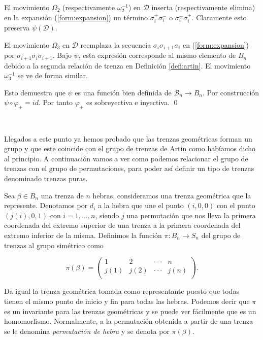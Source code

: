 \documentclass[12pt]{article}
\theoremstyle{definition}
\begin{document}
El movimiento $\Omega_2$ (respectivamente $\omega_2^{-1}$) en $\mathcal{D}$ inserta (respectivamente elimina) en la expansión (\ref{form:expansion}) un término $\sigma_i^+\sigma_i^-$ o $\sigma_i^-\sigma_i^+$. Claramente esto preserva $\psi(\mathcal{D})$.

El movimiento $\Omega_3$ en $\mathcal{D}$ reemplaza la secuencia $\sigma_{i}\sigma_{i+1}\sigma_{i}$ en (\ref{form:expansion}) por $\sigma_{i+1}\sigma_{i}\sigma_{i+1}$. Bajo $\psi$, esta expresión corresponde al mismo elemento de $B_n$ debido a la segunda relación de trenza en Definición \ref{defi:artin}. El movimiento $\omega_3^{-1}$ se ve de forma similar.

Esto demuestra que $\psi$ es una función bien definida de $\mathcal{B}_n\rightarrow B_n$. Por construcción $\psi\circ\varphi_+=id$. Por tanto $\varphi_+$ es sobreyectiva e inyectiva. \qed

\ 

Llegados a este punto ya hemos probado que las trenzas geométricas forman un grupo y que este coincide con el grupo de trenzas de Artin como habíamos dicho al principio. A continuación vamos a ver como podemos relacionar el grupo de trenzas con el grupo de permutaciones, para poder así definir un tipo de trenzas denominado trenzas puras.

Sea $\beta\in B_n$ una trenza de $n$ hebras, consideramos una trenza geométrica que la represente. Denotamos por $d_i$ a la hebra que une el punto $(i,0,0)$ con el punto $(j(i),0,1)$ con $i = 1,\ldots,n$, siendo $j$ una permutación que nos lleva la primera coordenada del extremo superior de una trenza a la primera coordenada del extremo inferior de la misma. Definimos la función $\pi:B_n\rightarrow S_n$ del grupo de trenzas al grupo simétrico como

$$\pi(\beta) = \begin{pmatrix}
1 & 2 & \cdot\cdot\cdot & n\\
j(1) & j(2) & \cdot\cdot\cdot & j(n)\\
\end{pmatrix}. $$


Da igual la trenza geométrica tomada como representante puesto que todas tienen el mismo punto de inicio y fin para todas las hebras. Podemos decir que $\pi$ es un invariante para las trenzas geométricas y se puede ver fácilmente que es un homomorfismo. Normalmente, a la permutación obtenida a partir de una trenza se le denomina \textit{permutación de hebra} y se denota por $\pi(\beta)$.
\end{document}
